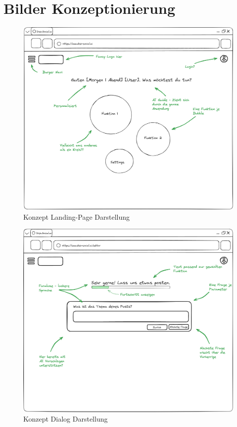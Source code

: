 \section{Bilder Konzeptionierung}\label{sec:bilder-konzeptionierung}

\begin{figure}[htbp]
    \centering
    \includegraphics[width=\textwidth]{abbildungen/Konzept/Konzept Landing Page}
    \caption[]{Konzept Landing-Page Darstellung}
    \label{fig:landing-page-concept}
\end{figure}
\newpage

\begin{figure}[htbp]
    \centering
    \includegraphics[width=\textwidth]{abbildungen/Konzept/Konzept Dialog}
    \caption[]{Konzept Dialog Darstellung}
    \label{fig:dialog-concept}
\end{figure}
\newpage

